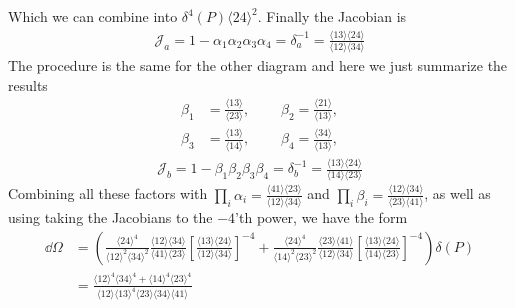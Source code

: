 \documentclass[letter,11pt]{article}
\newcommand{\ab}[1]{\langle #1 \rangle}
\begin{document}
Which we can combine into $\delta^4(P)\ab{24}^2$. Finally the Jacobian is
\begin{equation}
	\begin{aligned}
		\mathcal{J}_a=1-\alpha_{1}\alpha_{2}\alpha_{3}\alpha_{4}=\delta_a^{-1}=
		\frac{ \langle 13 \rangle\langle 24 \rangle}{\langle 1 2 \rangle \langle 34 \rangle}
	\end{aligned}
\end{equation}
The procedure is the same for the other diagram and here we just summarize the results
\begin{equation}
	\begin{aligned}
		\beta_1&=\frac{\langle 13 \rangle}{\langle 23\rangle},~~~~~~~~~~\beta_2=\frac{\langle 21 \rangle}{\langle 13\rangle},\\
		\beta_3&=\frac{\langle 13 \rangle}{\langle 14\rangle},~~~~~~~~~~	\beta_4=\frac{\langle 34 \rangle}{\langle 13\rangle},
	\end{aligned}
\end{equation}
\begin{equation}
	\begin{aligned}
		\mathcal{J}_b=1-\beta_{1}\beta_{2}\beta_{3}\beta_{4}=\delta_b^{-1}=
		\frac{ \langle 13 \rangle\langle 24 \rangle}{\langle 1 4 \rangle \langle 23 \rangle}
	\end{aligned}
\end{equation}
Combining all these factors with $\prod_i \alpha_i=\frac{\ab{41}\ab{23}}{\ab{12}\ab{34}}$ and $\prod_i \beta_i=\frac{\ab{12}\ab{34}}{\ab{23}\ab{41}}$, as well as using taking the Jacobians to the $-4$'th power, we have the form
\begin{equation}
	\begin{aligned}
		\dd \Omega &= \left(\frac{\ab{24}^4}{\ab{12}^2\ab{34}^2}\frac{ \ab{12}\ab{34}}{\ab{41}\ab{23} } \left[\frac{ \langle 13 \rangle\langle 24 \rangle}{\langle 1 2 \rangle \langle 34 \rangle}\right]^{-4}+\frac{\ab{24}^4}{\ab{14}^2\ab{23}^2}\frac{\ab{23}\ab{41}}{\ab{12}\ab{34}}\left[	\frac{ \langle 13 \rangle\langle 24 \rangle}{\langle 1 4 \rangle \langle 23 \rangle}\right]^{-4}\right)\delta(P)\\
		&=\frac{\ab{12}^4\ab{34}^4+\ab{14}^4\ab{23}^4}{\ab{12}\ab{13}^4\ab{23}\ab{34}\ab{41}}
	\end{aligned}
\end{equation}
\end{document}
